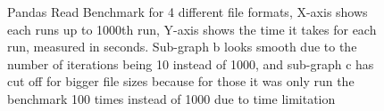 \begin{figure}[H]%
    \centering
    \quad
    \caption{Pandas Read Benchmark for 4 different file formats, X-axis shows each runs up to 1000th run, Y-axis shows the time it takes for each run, measured in seconds. Sub-graph b looks smooth due to the number of iterations being 10 instead of 1000, and sub-graph c has cut off for bigger file sizes because for those it was only run the benchmark 100 times instead of 1000 due to time limitation}%
    \label{fig:read_benchmarks}%
\end{figure}

